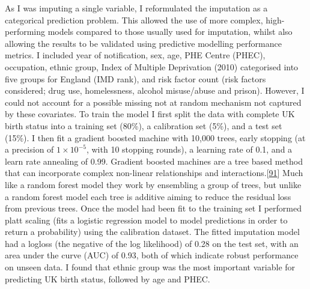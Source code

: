\documentclass[11pt,twoside]{bristolthesis}
\begin{document}
  As I was imputing a single variable, I reformulated the imputation as a categorical prediction problem. This allowed the use of more complex, high-performing models compared to those usually used for imputation, whilst also allowing the results to be validated using predictive modelling performance metrics. I included year of notification, sex, age, PHE Centre (PHEC), occupation, ethnic group, Index of Multiple Deprivation (2010) categorised into five groups for England (IMD rank), and risk factor count (risk factors considered; drug use, homelessness, alcohol misuse/abuse and prison). However, I could not account for a possible missing not at random mechanism not captured by these covariates. To train the model I first split the data with complete UK birth status into a training set (80\%), a calibration set (5\%), and a test set (15\%). I then fit a gradient boosted machine with 10,000 trees, early stopping (at a precision of \(1 \times 10^{-5}\), with 10 stopping rounds), a learning rate of 0.1, and a learn rate annealing of 0.99. Gradient boosted machines are a tree based method that can incorporate complex non-linear relationships and interactions.{[}\protect\hyperlink{ref-h2o2018}{91}{]} Much like a random forest model they work by ensembling a group of trees, but unlike a random forest model each tree is additive aiming to reduce the residual loss from previous trees. Once the model had been fit to the training set I performed platt scaling (fits a logistic regression model to model predictions in order to return a probability) using the calibration dataset. The fitted imputation model had a logloss (the negative of the log likelihood) of 0.28 on the test set, with an area under the curve (AUC) of 0.93, both of which indicate robust performance on unseen data. I found that ethnic group was the most important variable for predicting UK birth status, followed by age and PHEC.
  
\end{document}
